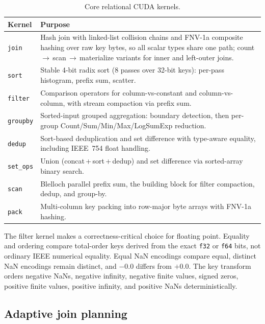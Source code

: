 \begin{table}[htbp]
  \centering
  \caption{Core relational CUDA kernels.}
  \label{tab:kernels}
  \small
  \begin{tabularx}{\linewidth}{@{}l L@{}}
    \toprule
    \textbf{Kernel} & \textbf{Purpose} \\
    \midrule
    \texttt{join}    & Hash join with linked-list collision chains and FNV-1a composite hashing over raw key bytes, so all scalar types share one path; count\,$\to$\,scan\,$\to$\,materialize variants for inner and left-outer joins. \\
    \texttt{sort}    & Stable 4-bit radix sort (8 passes over 32-bit keys): per-pass histogram, prefix sum, scatter. \\
    \texttt{filter}  & Comparison operators for column-vs-constant and column-vs-column, with stream compaction via prefix sum. \\
    \texttt{groupby} & Sorted-input grouped aggregation: boundary detection, then per-group Count/Sum/Min/Max/LogSumExp reduction. \\
    \texttt{dedup}   & Sort-based deduplication and set difference with type-aware equality, including IEEE~754 float handling. \\
    \texttt{set\_ops} & Union (concat\,+\,sort\,+\,dedup) and set difference via sorted-array binary search. \\
    \texttt{scan}    & Blelloch parallel prefix sum, the building block for filter compaction, dedup, and group-by. \\
    \texttt{pack}    & Multi-column key packing into row-major byte arrays with FNV-1a hashing. \\
    \bottomrule
  \end{tabularx}
\end{table}

The filter kernel makes a correctness-critical choice for floating point. Equality and ordering compare total-order keys derived from the exact \texttt{f32} or \texttt{f64} bits, not ordinary IEEE numerical equality. Equal NaN encodings compare equal, distinct NaN encodings remain distinct, and $-0.0$ differs from $+0.0$. The key transform orders negative NaNs, negative infinity, negative finite values, signed zeros, positive finite values, positive infinity, and positive NaNs deterministically.

\subsection{Adaptive join planning}

